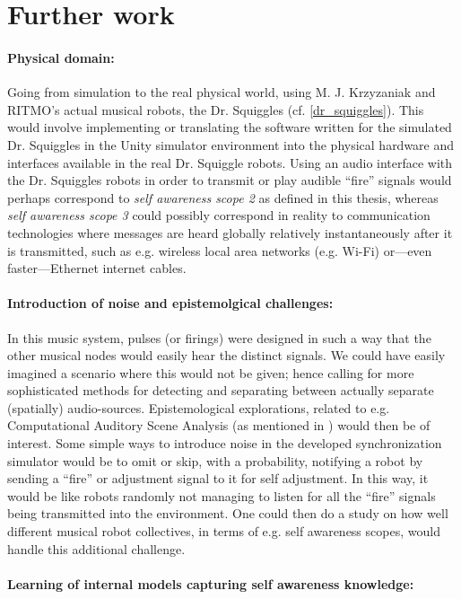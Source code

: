 \section{Further work}

	\paragraph{Physical domain:}
	Going from simulation to the real physical world, using M. J. Krzyzaniak and RITMO's  actual musical robots, the Dr. Squiggles (cf. \ref{dr_squiggles}). This would involve implementing or translating the software written for the simulated Dr. Squiggles in the Unity simulator environment into the physical hardware and interfaces available in the real Dr. Squiggle robots. Using an audio interface with the Dr. Squiggles robots in order to transmit or play audible ``fire'' signals would perhaps correspond to \textit{self awareness scope 2} as defined in this thesis, whereas \textit{self awareness scope 3} could possibly correspond in reality to communication technologies where messages are heard globally relatively instantaneously after it is transmitted, such as e.g. wireless local area networks (e.g. Wi-Fi) or—even faster—Ethernet internet cables.

	\paragraph{Introduction of noise and epistemolgical challenges:}
	In this music system, pulses (or firings) were designed in such a way that the other musical nodes would easily hear the distinct signals. We could have easily imagined a scenario where this would not be given; hence calling for more sophisticated methods for detecting and separating between actually separate (spatially) audio-sources. Epistemological explorations, related to e.g. Computational Auditory Scene Analysis (as mentioned in \cite{casa}) would then be of interest. Some simple ways to introduce noise in the developed synchronization simulator would be to omit or skip, with a probability, notifying a robot by sending a ``fire'' or adjustment signal to it for self adjustment. In this way, it would be like robots randomly not managing to listen for all the ``fire'' signals being transmitted into the environment. One could then do a study on how well different musical robot collectives, in terms of e.g. self awareness scopes, would handle this additional challenge.
	
	\paragraph{Learning of internal models capturing self awareness knowledge:}
	

